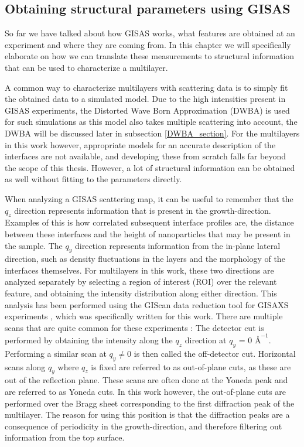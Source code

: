 \subsection{Obtaining structural parameters using GISAS}
So far we have talked about how GISAS works, what features are obtained at an experiment and where they are coming from. In this chapter we will specifically elaborate on how we can translate these measurements to structural information that can be used to characterize a multilayer.

A common way to characterize multilayers with scattering data is to simply fit the obtained data to a simulated model. Due to the high intensities present in GISAS experiments, the Distorted Wave Born Approximation (DWBA) is used for such simulations as this model also takes multiple scattering into account, the DWBA will be discussed later in subsection \ref{DWBA_section}. For the multilayers in this work however, appropriate models for an accurate description of the interfaces are not available, and developing these from scratch falls far beyond the scope of this thesis. However, a lot of structural information can be obtained as well without fitting to the parameters directly.

When analyzing a GISAS scattering map, it can be useful to remember that the $q_z$ direction represents information that is present in the growth-direction. Examples of this is how correlated subsequent interface profiles are, the distance between these interfaces and the height of nanoparticles that may be present in the sample. The $q_y$ direction represents information from the in-plane lateral direction, such as density fluctuations in the layers and the morphology of the interfaces themselves. For multilayers in this work, these two directions are analyzed separately by selecting a region of interest (ROI) over the relevant feature, and obtaining the intensity distribution along either direction. This analysis has been performed using the GIScan data reduction tool for GISAXS experiments \cite{giscan}, which was specifically written for this work. There are multiple scans that are quite common for these experiments \cite{matthias_GISAXS}: The detector cut is performed by obtaining the intensity along the $q_z$ direction at $q_y$ = 0 $Å^{-1}$. Performing a similar scan at $q_y \neq 0$ is then called the off-detector cut. Horizontal scans along $q_y$ where $q_z$ is fixed are referred to as out-of-plane cuts, as these are out of the reflection plane. These scans are often done at the Yoneda peak and are referred to as Yoneda cuts. In this work however, the out-of-plane cuts are performed over the Bragg sheet corresponding to the first diffraction peak of the multilayer. The reason for using this position is that the diffraction peaks are a consequence of periodicity in the growth-direction, and therefore filtering out information from the top surface.

